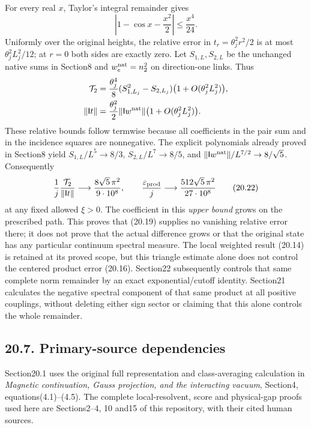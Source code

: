 \documentclass[
]{article}
\begin{document}
For every real \(x\), Taylor's integral remainder gives \[
\left|1-\cos x-\frac{x^2}{2}\right|\le\frac{x^4}{24}.
\] Uniformly over the original heights, the relative error in
\(t_r=\theta_j^2r^2/2\) is at most \(\theta_j^2L_j^2/12\); at \(r=0\)
both sides are exactly zero. Let \(S_{1,L},S_{2,L}\) be the unchanged
native sums in Section8 and \(w_e^{\rm nat}=n_2^2\) on direction-one
links. Thus \[
\begin{aligned}
\mathcal T_2&=\frac{\theta_j^4}{8}
 (S_{1,L_j}^2-S_{2,L_j})
       \bigl(1+O(\theta_j^2L_j^2)\bigr),\\
\|\mathsf It\|&=\frac{\theta_j^2}{2}\|\mathsf Iw^{\rm nat}\|
       \bigl(1+O(\theta_j^2L_j^2)\bigr).
\end{aligned}
\] These relative bounds follow termwise because all coefficients in the
pair sum and in the incidence squares are nonnegative. The explicit
polynomials already proved in Section8 yield \(S_{1,L}/L^5\to8/3\),
\(S_{2,L}/L^7\to8/5\), and
\(\|\mathsf Iw^{\rm nat}\|/L^{7/2}\to8/\sqrt5\). Consequently \[
\frac1j\frac{\mathcal T_2}{\|\mathsf It\|}
 \longrightarrow\frac{8\sqrt5\,\pi^2}{9\cdot10^8},\qquad
\frac{\varepsilon_{\rm prod}}j
 \longrightarrow\frac{512\sqrt5\,\pi^2}{27\cdot10^8}
                                                               \tag{20.22}
\] at any fixed allowed \(\xi>0\). The coefficient in this \emph{upper
bound} grows on the prescribed path. This proves that (20.19) supplies
no vanishing relative error there; it does not prove that the actual
difference grows or that the original state has any particular continuum
spectral measure. The local weighted result (20.14) is retained at its
proved scope, but this triangle estimate alone does not control the
centered product error (20.16). Section22 subsequently controls that
same complete norm remainder by an exact exponential/cutoff identity.
Section21 calculates the negative spectral component of that same
product at all positive couplings, without deleting either sign sector
or claiming that this alone controls the whole remainder.

\subsection{20.7. Primary-source
dependencies}\label{primary-source-dependencies}

Section20.1 uses the original full representation and class-averaging
calculation in \emph{Magnetic continuation, Gauss projection, and the
interacting vacuum}, Section4, equations(4.1)--(4.5). The complete
local-resolvent, score and physical-gap proofs used here are
Sections2--4, 10 and15 of this repository, with their cited human
sources.
\end{document}
